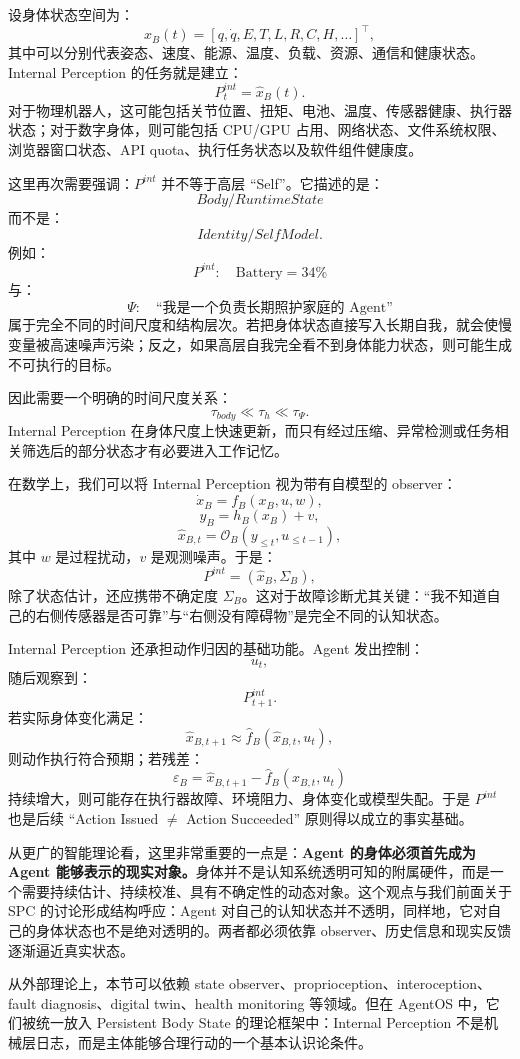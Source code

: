 设身体状态空间为：
\[
x_B(t)
=
[
q,
\dot q,
E,
T,
L,
R,
C,
H,\ldots
]^\top,
\]
其中可以分别代表姿态、速度、能源、温度、负载、资源、通信和健康状态。Internal Perception 的任务就是建立：
\[
P_t^{int}
=
\hat{x}_B(t).
\]
对于物理机器人，这可能包括关节位置、扭矩、电池、温度、传感器健康、执行器状态；对于数字身体，则可能包括 CPU/GPU 占用、网络状态、文件系统权限、浏览器窗口状态、API quota、执行任务状态以及软件组件健康度。

这里再次需要强调：$P^{int}$ 并不等于高层 ``Self''。它描述的是：
\[
\boxed{
Body/Runtime State
}
\]
而不是：
\[
\boxed{
Identity/Self Model.
}
\]
例如：
\[
P^{int}:
\quad
\mathrm{Battery}=34\%
\]
与：
\[
\Psi:
\quad
\text{``我是一个负责长期照护家庭的 Agent''}
\]
属于完全不同的时间尺度和结构层次。若把身体状态直接写入长期自我，就会使慢变量被高速噪声污染；反之，如果高层自我完全看不到身体能力状态，则可能生成不可执行的目标。

因此需要一个明确的时间尺度关系：
\[
\tau_{body}
\ll
\tau_h
\ll
\tau_\Psi.
\]
Internal Perception 在身体尺度上快速更新，而只有经过压缩、异常检测或任务相关筛选后的部分状态才有必要进入工作记忆。

在数学上，我们可以将 Internal Perception 视为带有自模型的 observer：
\[
\dot{x}_B
=
f_B(x_B,u,w),
\]
\[
y_B
=
h_B(x_B)+v,
\]
\[
\hat{x}_{B,t}
=
\mathcal O_B(
y_{\leq t},
u_{\leq t-1}
),
\]
其中 $w$ 是过程扰动，$v$ 是观测噪声。于是：
\[
P^{int}
=
(\hat{x}_B,\Sigma_B),
\]
除了状态估计，还应携带不确定度 $\Sigma_B$。这对于故障诊断尤其关键：``我不知道自己的右侧传感器是否可靠''与``右侧没有障碍物''是完全不同的认知状态。

Internal Perception 还承担动作归因的基础功能。Agent 发出控制：
\[
u_t,
\]
随后观察到：
\[
P_{t+1}^{int}.
\]
若实际身体变化满足：
\[
\hat{x}_{B,t+1}
\approx
\hat{f}_B(
\hat{x}_{B,t},u_t
),
\]
则动作执行符合预期；若残差：
\[
\varepsilon_B
=
\hat{x}_{B,t+1}
-
\hat{f}_B(
\hat{x}_{B,t},u_t
)
\]
持续增大，则可能存在执行器故障、环境阻力、身体变化或模型失配。于是 $P^{int}$ 也是后续 ``Action Issued $\neq$ Action Succeeded'' 原则得以成立的事实基础。

从更广的智能理论看，这里非常重要的一点是：\textbf{Agent 的身体必须首先成为 Agent 能够表示的现实对象。}身体并不是认知系统透明可知的附属硬件，而是一个需要持续估计、持续校准、具有不确定性的动态对象。这个观点与我们前面关于 SPC 的讨论形成结构呼应：Agent 对自己的认知状态并不透明，同样地，它对自己的身体状态也不是绝对透明的。两者都必须依靠 observer、历史信息和现实反馈逐渐逼近真实状态。

从外部理论上，本节可以依赖 state observer、proprioception、interoception、fault diagnosis、digital twin、health monitoring 等领域。但在 AgentOS 中，它们被统一放入 Persistent Body State 的理论框架中：Internal Perception 不是机械层日志，而是主体能够合理行动的一个基本认识论条件。

